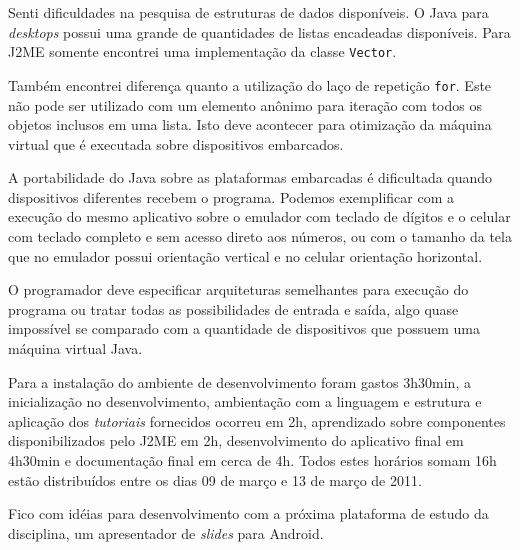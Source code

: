 \documentclass{article}
\begin{document}
Senti dificuldades na pesquisa de estruturas de dados disponíveis. O Java para
\emph{desktops} possui uma grande de quantidades de listas encadeadas
disponíveis. Para J2ME somente encontrei uma implementação da classe
\texttt{Vector}.

Também encontrei diferença quanto a utilização do laço de repetição
\texttt{for}. Este não pode ser utilizado com um elemento anônimo para iteração
com todos os objetos inclusos em uma lista. Isto deve acontecer para otimização
da máquina virtual que é executada sobre dispositivos embarcados.

A portabilidade do Java sobre as plataformas embarcadas é dificultada quando
dispositivos diferentes recebem o programa. Podemos exemplificar com a execução
do mesmo aplicativo sobre o emulador com teclado de dígitos e o celular com
teclado completo e sem acesso direto aos números, ou com o tamanho da tela que
no emulador possui orientação vertical e no celular orientação horizontal.

O programador deve especificar arquiteturas semelhantes para execução do
programa ou tratar todas as possibilidades de entrada e saída, algo quase
impossível se comparado com a quantidade de dispositivos que possuem uma máquina
virtual Java.

Para a instalação do ambiente de desenvolvimento foram gastos 3h30min, a
inicialização no desenvolvimento, ambientação com a linguagem e estrutura e
aplicação dos \emph{tutoriais} fornecidos ocorreu em 2h, aprendizado sobre
componentes disponibilizados pelo J2ME em 2h, desenvolvimento do aplicativo
final em 4h30min e documentação final em cerca de 4h. Todos estes horários somam
16h estão distribuídos entre os dias 09 de março e 13 de março de 2011.

Fico com idéias para desenvolvimento com a próxima plataforma de estudo da
disciplina, um apresentador de \emph{slides} para Android.
\end{document}
